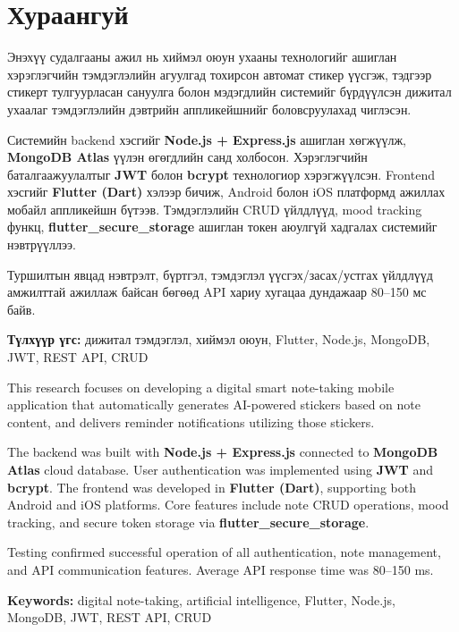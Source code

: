 \chapter*{Хураангуй}

\noindent
Энэхүү судалгааны ажил нь хиймэл оюун ухааны технологийг ашиглан хэрэглэгчийн
тэмдэглэлийн агуулгад тохирсон автомат стикер үүсгэж, тэдгээр стикерт тулгуурласан
сануулга болон мэдэгдлийн системийг бүрдүүлсэн дижитал ухаалаг тэмдэглэлийн дэвтрийн
аппликейшнийг боловсруулахад чиглэсэн.

Системийн backend хэсгийг \textbf{Node.js + Express.js} ашиглан хөгжүүлж,
\textbf{MongoDB Atlas} үүлэн өгөгдлийн санд холбосон. Хэрэглэгчийн баталгаажуулалтыг
\textbf{JWT} болон \textbf{bcrypt} технологиор хэрэгжүүлсэн. Frontend хэсгийг
\textbf{Flutter (Dart)} хэлээр бичиж, Android болон iOS платформд ажиллах мобайл
аппликейшн бүтээв. Тэмдэглэлийн CRUD үйлдлүүд, mood tracking функц,
\textbf{flutter\_secure\_storage} ашиглан токен аюулгүй хадгалах системийг нэвтрүүллээ.

Туршилтын явцад нэвтрэлт, бүртгэл, тэмдэглэл үүсгэх/засах/устгах үйлдлүүд амжилттай
ажиллаж байсан бөгөөд API хариу хугацаа дундажаар 80--150 мс байв.

\vspace{0.5cm}
\noindent\textbf{Түлхүүр үгс:} дижитал тэмдэглэл, хиймэл оюун, Flutter, Node.js,
MongoDB, JWT, REST API, CRUD

\vspace{1cm}

\vspace{0.4cm}
\noindent
This research focuses on developing a digital smart note-taking mobile application that
automatically generates AI-powered stickers based on note content, and delivers reminder
notifications utilizing those stickers.

The backend was built with \textbf{Node.js + Express.js} connected to \textbf{MongoDB Atlas}
cloud database. User authentication was implemented using \textbf{JWT} and \textbf{bcrypt}.
The frontend was developed in \textbf{Flutter (Dart)}, supporting both Android and iOS
platforms. Core features include note CRUD operations, mood tracking, and secure token
storage via \textbf{flutter\_secure\_storage}.

Testing confirmed successful operation of all authentication, note management, and API
communication features. Average API response time was 80--150 ms.

\vspace{0.5cm}
\noindent\textbf{Keywords:} digital note-taking, artificial intelligence, Flutter, Node.js,
MongoDB, JWT, REST API, CRUD
